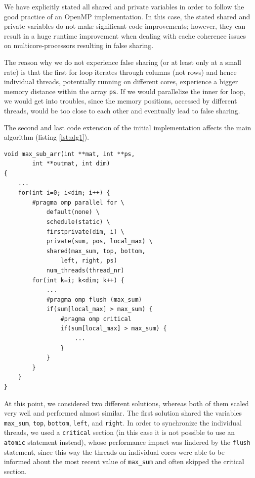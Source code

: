 \documentclass[conference]{IEEEtran}
\begin{document}
We have explicitly stated all shared and private variables in order to follow the good practice of an OpenMP implementation. In this case, the stated shared and private variables do not make significant code improvements; however, they can result in a huge runtime improvement when dealing with cache coherence issues on multicore-processors resulting in false sharing. 

The reason why we do not experience false sharing (or at least only at a small rate) is that the first for loop iterates through columns (not rows) and hence individual threads, potentially running on different cores, experience a bigger memory distance within the array \texttt{ps}. If we would parallelize the inner for loop, we would get into troubles, since the memory positions, accessed by different threads, would be too close to each other and eventually lead to false sharing. 

The second and last code extension of the initial implementation affects the main algorithm (listing \ref{lst:alg1}). 


\begin{center}
   \begin{lstlisting}[captionpos=b, caption=OpenMP: Parallel Main Algorithm - First Approach, label=lst:alg1]  
void max_sub_arr(int **mat, int **ps, 
        int **outmat, int dim)                                                   
{                                                              
    ... 
    for(int i=0; i<dim; i++) {
        #pragma omp parallel for \
            default(none) \
            schedule(static) \
            firstprivate(dim, i) \
            private(sum, pos, local_max) \
            shared(max_sum, top, bottom, 
                left, right, ps)
            num_threads(thread_nr)
        for(int k=i; k<dim; k++) { 
            ...
            #pragma omp flush (max_sum)       
            if(sum[local_max] > max_sum) {    
                #pragma omp critical          
                if(sum[local_max] > max_sum) {
                    ...
                }
            }              
        }
    }
}
   \end{lstlisting}
\end{center}	

At this point, we considered two different solutions, whereas both of them scaled very well and performed almost similar. The first solution shared the variables \texttt{max\_sum}, \texttt{top}, \texttt{bottom}, \texttt{left}, and \texttt{right}. In order to synchronize the individual threads, we used a \texttt{critical} section (in this case it is not possible to use an \texttt{atomic} statement instead), whose performance impact was lindered by the \texttt{flush} statement, since this way the threads on individual cores were able to be informed about the most recent value of \texttt{max\_sum} and often skipped the critical section. 
\end{document}
